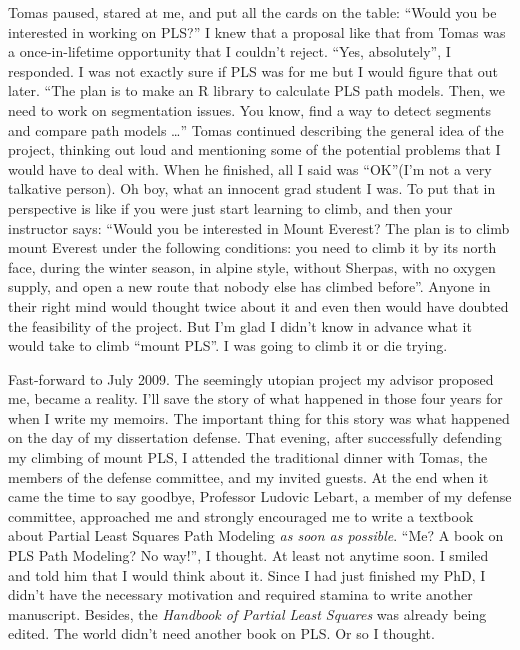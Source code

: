 \documentclass[12pt]{book}\usepackage{graphicx, color}
\begin{document}
Tomas paused, stared at me, and put all the cards on the table: ``Would you be interested in working on PLS?'' I knew that a proposal like that from Tomas was a once-in-lifetime opportunity that I couldn't reject. ``Yes, absolutely'', I responded. I was not exactly sure if PLS was for me but I would figure that out later. ``The plan is to make an R library to calculate PLS path models. Then, we need to work on segmentation issues. You know, find a way to detect segments and compare path models \dots'' Tomas continued describing the general idea of the project, thinking out loud and mentioning some of the potential problems that I would have to deal with. When he finished, all I said was ``OK''(I'm not a very talkative person). Oh boy, what an innocent grad student I was. To put that in perspective is like if you were just start learning to climb, and then your instructor says: ``Would you be interested in Mount Everest? The plan is to climb mount Everest under the following conditions: you need to climb it by its north face, during the winter season, in alpine style, without Sherpas, with no oxygen supply, and open a new route that nobody else has climbed before''. Anyone in their right mind would thought twice about it and even then would have doubted the feasibility of the project. But I'm glad I didn't know in advance what it would take to climb ``mount PLS''. I was going to climb it or die trying.

Fast-forward to July 2009. The seemingly utopian project my advisor proposed me, became a reality. I'll save the story of what happened in those four years for when I write my memoirs. The important thing for this story was what happened on the day of my dissertation defense. That evening, after successfully defending my climbing of mount PLS, I attended the traditional dinner with Tomas, the members of the defense committee, and my invited guests. At the end when it came the time to say goodbye, Professor Ludovic Lebart, a member of my defense committee, approached me and strongly encouraged me to write a textbook about Partial Least Squares Path Modeling \textit{as soon as possible}. ``Me? A book on PLS Path Modeling? No way!'', I thought. At least not anytime soon. I smiled and told him that I would think about it. Since I had just finished my PhD, I didn't have the necessary motivation and required stamina to write another manuscript. Besides, the \textit{Handbook of Partial Least Squares} was already being edited. The world didn't need another book on PLS. Or so I thought.
\end{document}
